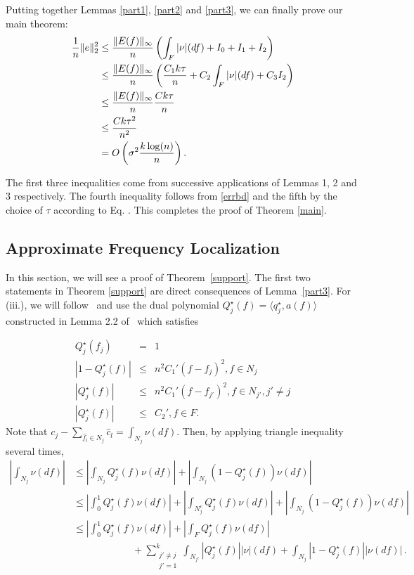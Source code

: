 Putting together Lemmas \ref{part1}, \ref{part2} and \ref{part3}, we can finally prove our main theorem:
\begin{align*}
\frac{1}{n}\lVert e\rVert_2^2 
&\leq \frac{\lVert E(f)\rVert_\infty}{n} \left(\int_F{|\nu|(df)} + I_0 + I_1 + I_2\right)\\
&\leq \frac{\lVert E(f)\rVert_\infty}{n} \left(\frac{C_1 k \tau}{n} + C_2 \int_F{|\nu|(df)} + C_3 I_2\right)\\
&\leq  \frac{\lVert E(f)\rVert_\infty}{n} \frac{C k \tau}{n} \\
& \leq \frac{C k \tau^2}{n^2}\\
&= O\left(\sigma^2\frac{k \log(n)}{n}\right).
\end{align*}

The first three inequalities come from successive applications of Lemmas 1, 2
and 3 respectively. The fourth inequality follows from \eqref{errbd} and the
fifth by the choice of $\tau$ according to Eq. . This completes the
proof of Theorem \ref{main}.

\subsection{Approximate Frequency Localization}
\label{sec:support}

In this section, we will see a proof of Theorem~\ref{support}. The first two
statements in Theorem \ref{support} are direct consequences of
Lemma~\ref{part3}. For (iii.), we  will follow~\cite{granda2} and use the dual
polynomial $Q_j^{\star} ( f) = \langle q_j^{\star}, a ( f)\rangle$ constructed
in Lemma 2.2 of~\cite{granda2} which satisfies

\begin{eqnarray*}
  Q_j^{\star} ( f_j) & = & 1\\
  | 1 - Q_j^{\star} ( f) | & \leq & n^2 C_1' ( f - f_j)^2, f \in N_j\\
  | Q_j^{\star} ( f) | & \leq & n^2 C_1' ( f - f_{j'})^2, f \in N_{j'}, j' \neq
  j\\
  | Q_j^{\star} ( f) | & \leq & C_2', f \in F.
\end{eqnarray*}
Note that $c_j - \sum_{\hat{f}_l \in N_j} \hat{c}_l = \int_{N_j} \nu(df)$. Then, by applying triangle inequality several times,
\begin{align*}
\left| \int_{N_j}  \nu(df)\right|
& \leq \left| \int_{N_j}  Q_j^\star (f) \nu(df)\right| + \left| \int_{N_j}  (1-Q_j^\star (f)) \nu(df)\right|\\
& \leq \left| \int_0^1  Q_j^\star (f) \nu(df)\right| + \left| \int_{N_j^c}  Q_j^\star (f) \nu(df)\right| + \left| \int_{N_j}  (1-Q_j^\star (f)) \nu(df)\right|\\
& \leq \left|\int_0^1  Q_j^\star (f) \nu(df)\right| + \left| \int_{F}  Q_j^\star (f) \nu(df)\right| \\
&\qquad\qquad\qquad + \sum_{\substack{j' \neq j\\j'=1}}^k \int_{N_{j'}} \left| Q_j^\star (f)\right| |\nu|(df) +  \int_{N_j}  \left|1-Q_j^\star (f)\right| |\nu(df)|\,.
\end{align*}

